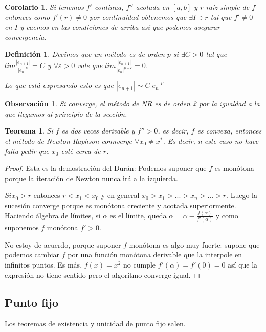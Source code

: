 \documentclass[10pt,a4paper,final]{report}
\newtheorem{theorem}{Teorema}
\newtheorem{definition}{Definición}
\newtheorem{observation}{Observación}
\newtheorem{corollary}{Corolario}
\begin{document}
{\begin{corollary}
	Si tenemos $f'$ continua, $f''$ acotada en $[a,b]$ y $r$ raíz simple de $f$ entonces como $f'(r)\neq 0$ por continuidad obtenemos que $\exists I \ni r$ tal que $f'\neq0$ en $I$ y caemos en las condiciones de arriba así que podemos asegurar convergencia.
\end{corollary}


\begin{definition}
	Decimos que un método es de orden $p$ si $\exists C > 0$ tal que $lim \frac{|e_{n+1}|}{|e_n|^p} = C$ y $\forall \varepsilon > 0$ vale que $lim \frac{|e_{n+1}|}{|e_n|^{p-\varepsilon}}=0$.
	
	Lo que está expresando esto es que $|e_{n+1}|\sim  C |e_n|^p$ 
\end{definition}

\begin{observation}
	Si converge, el método de NR es de orden 2 por la igualdad a la que llegamos al principio de la sección.
\end{observation}


\begin{theorem}
	Si $f$ es dos veces derivable y $f''>0$, es decir, $f$ es convexa, entonces el método de Newton-Raphson connverge $\forall x_0 \neq x^*$. Es decir, n este caso no hace falta pedir que $x_0$ esté cerca de $r$.
\end{theorem}

\begin{proof}

	Esta es la demostración del Durán:
	Podemos suponer que $f$ es monótona porque la iteración de Newton nunca irá a la izquierda.
	
	$Si x_0 > r$ entonces $r < x_1 < x_0$ y en general $x_0 > x_1 > ... > x_n > ... > r$. Luego la sucesión converge porque es monótona creciente y acotada superiormente. Haciendo álgebra de límites, si $\alpha$ es el límite, queda  $\alpha = \alpha - \frac{f(\alpha)}{f'(\alpha)}$ y como suponemos $f$ monótona $f'>0$.
	
	No estoy de acuerdo, porque suponer $f$ monótona es algo muy fuerte: supone que podemos cambiar $f$ por una función monótona derivable que la interpole en infinitos puntos. Es más, $f(x) = x^2$ no cumple $f'(\alpha) = f'(0) = 0$ así que la expresión no tiene sentido pero el algoritmo converge igual. 
\end{proof}

\subsection{Punto fijo}
Los teoremas de existencia y unicidad de punto fijo salen.

}
\end{document}
